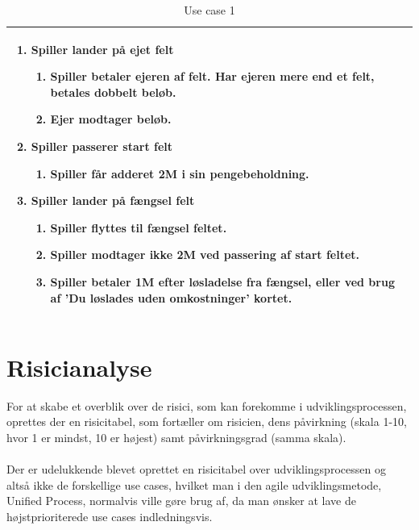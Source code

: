 \begin{table}[H]
\begin{center}
\begin{tabular}{ | p{15cm} |}
\begin{enumerate}
\begin{enumerate}
                \end{enumerate}
                \item \textbf{Spiller lander på ejet felt}
                \begin{enumerate}
                    \item {Spiller betaler ejeren af felt. Har ejeren mere end et felt, betales dobbelt beløb.}
                    \item {Ejer modtager beløb.}                    
                \end{enumerate}
                \item \textbf{Spiller passerer start felt}
                \begin{enumerate}
                    \item {Spiller får adderet 2M i sin pengebeholdning.}
                \end{enumerate}
                \item \textbf{Spiller lander på fængsel felt}
                \begin{enumerate}
                    \item {Spiller flyttes til fængsel feltet.}
                    \item {Spiller modtager ikke 2M ved passering af start feltet.}
                    \item {Spiller betaler 1M efter løsladelse fra fængsel, eller ved brug af 'Du løslades uden omkostninger' kortet.}
                \end{enumerate}
            \end{enumerate} \\ \hline
            \hline
        \end{tabular}
        \caption{Use case 1}
        \label{usecase:1}
    \end{center}
\end{table}

\newpage
\section{Risicianalyse}
For at skabe et overblik over de risici, som kan forekomme i udviklingsprocessen, oprettes der en risicitabel, som fortæller om risicien, dens påvirkning (skala 1-10, hvor 1 er mindst, 10 er højest) samt påvirkningsgrad (samma skala). \\ \\
Der er udelukkende blevet oprettet en risicitabel over udviklingsprocessen og altså ikke de forskellige use cases, hvilket man i den agile udviklingsmetode, Unified Process, normalvis ville gøre brug af, da man ønsker at lave de højstprioriterede use cases indledningsvis.

